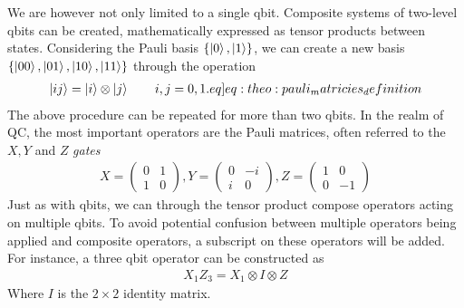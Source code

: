 We are however not only limited to a single qbit. Composite systems of two-level qbits can be created, mathematically expressed as tensor products between states. Considering the Pauli basis $\{\ket{0},\ket{1}\}$, we can create a new basis $\{\ket{00},\ket{01},\ket{10},\ket{11}\}$ through the operation
\begin{align}
    \ket{ij} = \ket{i} \otimes \ket{j} \hspace{20px} i,j=0,1. \label[eq]{eq:theo:pauli_matricies_definition}
\end{align}
The above procedure can be repeated for more than two qbits. In the realm of QC, the most important operators are the Pauli matrices, often referred to the $X,Y$ and $Z$ \textit{gates} 
\begin{align}
    X = \begin{pmatrix}
        0 & 1 \\
        1 & 0
    \end{pmatrix}, Y = \begin{pmatrix}
        0 & -i \\
        i & 0
    \end{pmatrix}, Z = \begin{pmatrix}
        1 & 0 \\
        0 & -1
    \end{pmatrix}
\end{align}
Just as with qbits, we can through the tensor product compose operators acting on multiple qbits. To avoid potential confusion between multiple operators being applied and composite operators, a subscript on these operators will be added. For instance, a three qbit operator can be constructed as
\begin{align}
    X_1 Z_3 = X_1 \otimes I \otimes Z 
\end{align} 
Where $I$ is the $2 \times 2$ identity matrix.

